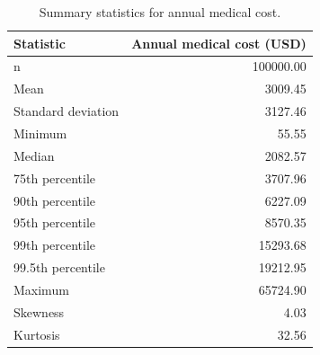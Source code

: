 \begin{table}
\caption{Summary statistics for annual medical cost.}
\label{tab:01-target-summary}
\begin{tabular}{lr}
\toprule
Statistic & Annual medical cost (USD) \\
\midrule
n & 100000.00 \\
Mean & 3009.45 \\
Standard deviation & 3127.46 \\
Minimum & 55.55 \\
Median & 2082.57 \\
75th percentile & 3707.96 \\
90th percentile & 6227.09 \\
95th percentile & 8570.35 \\
99th percentile & 15293.68 \\
99.5th percentile & 19212.95 \\
Maximum & 65724.90 \\
Skewness & 4.03 \\
Kurtosis & 32.56 \\
\bottomrule
\end{tabular}
\end{table}
